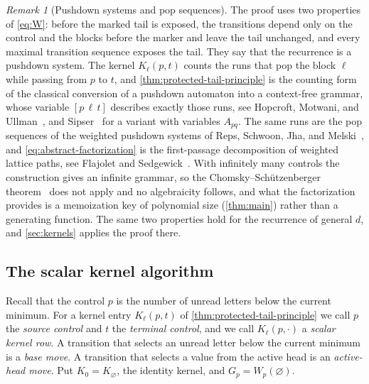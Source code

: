 \documentclass[11pt,reqno]{amsart}
\theoremstyle{definition}
\theoremstyle{remark}
\newtheorem{remark}[remark]{Remark}
\begin{document}
\begin{remark}[Pushdown systems and pop sequences]
\label{rem:pop-sequences}
The proof uses two properties of \eqref{eq:W}: before the marked tail is
exposed, the transitions depend only on the control and the blocks before
the marker and leave the tail unchanged, and every maximal transition
sequence exposes the tail.  They say that the recurrence is a pushdown
system.  The kernel $K_\ell(p,t)$ counts the runs that pop the block $\ell$
while passing from $p$ to $t$, and \cref{thm:protected-tail-principle} is the
counting form of the classical conversion of a pushdown automaton into a
context-free grammar, whose variable $[p\,\ell\,t]$ describes exactly those
runs, see Hopcroft, Motwani, and
Ullman~\cite[Theorem~6.14]{HopcroftMotwaniUllman2001}, and
Sipser~\cite[Lemma~2.27]{Sipser2013} for a variant with variables $A_{pq}$.  The same runs are the pop sequences
of the weighted pushdown systems of Reps, Schwoon, Jha, and
Melski~\cite{RepsSchwoonJhaMelski2005}, and
\eqref{eq:abstract-factorization} is the first-passage decomposition of
weighted lattice paths, see Flajolet and
Sedgewick~\cite[Sections~I.5.3 and~V.4]{FlajoletSedgewick2009}.  With
infinitely many controls the construction gives an infinite grammar, so the
Chomsky--Sch\"utzenberger theorem~\cite{ChomskySchutzenberger1963} does not
apply and no algebraicity follows, and what the factorization provides is a
memoization key of polynomial size (\cref{thm:main}) rather than a
generating function.  The same two properties hold for the recurrence of
general $d$, and \cref{sec:kernels} applies the proof there.
\end{remark}

\subsection{The scalar kernel algorithm}\label{sec:scalar-kernel}

Recall that the control $p$ is the number of unread letters below the
current minimum.  For a kernel entry $K_\ell(p,t)$ of
\cref{thm:protected-tail-principle} we call $p$ the \emph{source control}
and $t$ the \emph{terminal control}, and we call $K_\ell(p,\mathord\cdot)$ a
\emph{scalar kernel row}.  A transition that selects an unread letter below the current
minimum is a \emph{base move}.  A transition that selects a value from the
active head is an \emph{active-head move}.  Put $K_0=K_\varnothing$, the
identity kernel, and $G_p=W_p(\varnothing)$.
\end{document}
